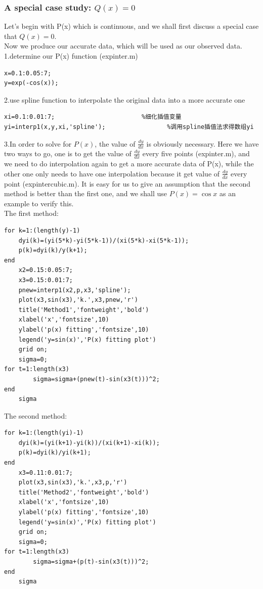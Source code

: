 \documentclass[a4paper]{article}
\begin{document}
\subsubsection{A special case study: $Q(x)=0$}
Let's begin with P(x) which is continuous, and we shall first discuss a special case that $Q(x)=0$.\\
Now we produce our accurate data, which will be used as our observed data.\\
1.determine our P(x) function (expinter.m)
\begin{verbatim}
x=0.1:0.05:7;
y=exp(-cos(x));
\end{verbatim}
2.use spline function to interpolate the original data into a more accurate one
\begin{verbatim}
xi=0.1:0.01:7;                        %细化插值变量
yi=interp1(x,y,xi,'spline');                 %调用spline插值法求得数组yi
\end{verbatim}
3.In order to solve for $P(x)$, the value of $\frac{{dy}}{{dx}}$ is obviously necessary. Here we have two ways to go, one is to get the value of $\frac{{dy}}{{dx}}$ every five points (expinter.m), and we need to do interpolation again to get a more accurate data of P(x), while the other one only needs to have one interpolation because it get value of $\frac{{dy}}{{dx}}$ every point (expintercubic.m). It is easy for us to give an assumption that the second method is better than the first one, and we shall use $P(x) = \cos x$ as an example to verify this.\\
The first method:
\begin{verbatim}
for k=1:(length(y)-1)
    dyi(k)=(yi(5*k)-yi(5*k-1))/(xi(5*k)-xi(5*k-1));
    p(k)=dyi(k)/y(k+1);
end
    x2=0.15:0.05:7;
    x3=0.15:0.01:7;
    pnew=interp1(x2,p,x3,'spline');
    plot(x3,sin(x3),'k.',x3,pnew,'r')
    title('Method1','fontweight','bold')
    xlabel('x','fontsize',10)
    ylabel('p(x) fitting','fontsize',10)
    legend('y=sin(x)','P(x) fitting plot')
    grid on;
    sigma=0;
for t=1:length(x3)
        sigma=sigma+(pnew(t)-sin(x3(t)))^2;
end
    sigma
\end{verbatim}
The second method:
\begin{verbatim}
for k=1:(length(yi)-1)
    dyi(k)=(yi(k+1)-yi(k))/(xi(k+1)-xi(k));
    p(k)=dyi(k)/yi(k+1);
end
    x3=0.11:0.01:7;
    plot(x3,sin(x3),'k.',x3,p,'r')
    title('Method2','fontweight','bold')
    xlabel('x','fontsize',10)
    ylabel('p(x) fitting','fontsize',10)
    legend('y=sin(x)','P(x) fitting plot')
    grid on;
    sigma=0;
for t=1:length(x3)
        sigma=sigma+(p(t)-sin(x3(t)))^2;
end
    sigma
\end{verbatim}
\end{document}
